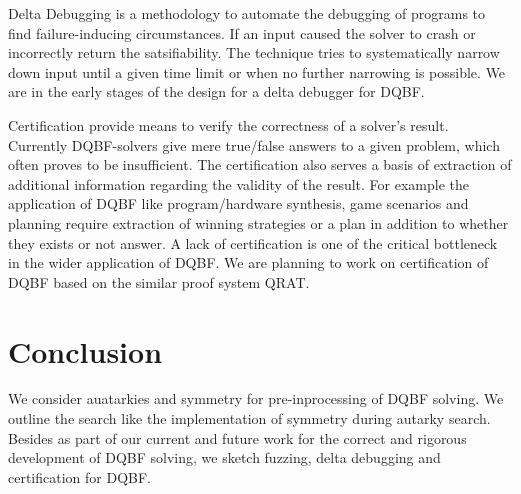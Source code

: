 \documentclass[conference]{IEEEtran}
\begin{document}
Delta Debugging is a methodology to automate the debugging of programs to find failure-inducing circumstances. 
%
If an input caused the solver to crash or incorrectly return the satsifiability. 
%
The technique tries to systematically narrow down input until a given time limit or when no further narrowing is possible.
%
We are in the early stages of the design for a delta debugger for DQBF.


Certification provide means to verify the correctness of a solver’s result.
%
Currently DQBF-solvers give mere true/false answers to a given problem, which often proves to be insufficient.
%
The certification also serves a basis of extraction of additional information regarding the validity of the result. 
% 
For example the application of DQBF like program/hardware synthesis, game scenarios and planning require extraction of winning strategies or a plan in addition to whether they exists or not answer.
%
A lack of certification is one of the critical bottleneck in the wider application of DQBF.
%
We are planning to work on certification of DQBF based on the similar proof system QRAT. 


\section{Conclusion}
\label{sec:conc}

We consider auatarkies and symmetry for pre-inprocessing of DQBF solving.
%
We outline the search like the implementation of symmetry during autarky search.
%
Besides as part of our current and future work for the correct and rigorous development of DQBF solving, we sketch fuzzing, delta debugging and certification for DQBF.


%
%


\end{document}
